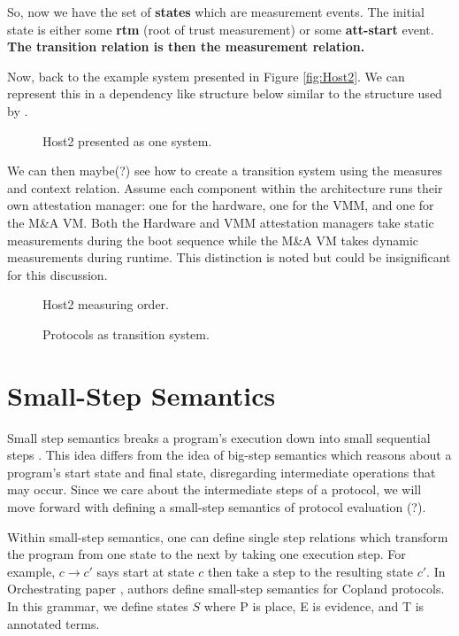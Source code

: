 \documentclass[12pt, letterpaper]{article}
\begin{document}
So, now we have the set of \textbf{states} which are measurement events. The initial state is either some \textbf{rtm} (root of trust measurement) or some \textbf{att-start} event. \textbf{The transition relation is then the measurement relation.} 

Now, back to the example system presented in Figure \ref{fig:Host2}. We can represent this in a dependency like structure below similar to the structure used by \cite{Rowe::Bundling}. 

\begin{figure}[hbtp]
  \centering
  
  \caption{Host2 presented as one system.}
  \label{host2-block}
\end{figure}

We can then maybe(?) see how to create a transition system using the measures and context relation. Assume each component within the architecture runs their own attestation manager: one for the hardware, one for the VMM, and one for the M\&A VM. Both the Hardware and VMM attestation managers take static measurements during the boot sequence while the M\&A VM takes dynamic measurements during runtime. This distinction is noted but could be insignificant for this discussion. 

\begin{figure}[hbtp]
  \centering
  
  \caption{Host2 measuring order.}
  \label{host2-measord}
\end{figure}

\begin{figure}[hbtp]
  \centering
  
  \caption{Protocols as transition system.}
  \label{transSys}
\end{figure}



\section{Small-Step Semantics}

Small step semantics breaks a program's execution down into small sequential steps \cite{FRAP}. This idea differs from the idea of big-step semantics which reasons about a program's start state and final state, disregarding intermediate operations that may occur. Since we care about the intermediate steps of a protocol, we will move forward with defining a small-step semantics of protocol evaluation (?). 

Within small-step semantics, one can define single step relations which transform the program from one state to the next by taking one execution step. For example, $c \to c'$ says start at state $c$ then take a step to the resulting state $c'$. In Orchestrating paper \cite{Ramsdell::Orchestrating}, authors define small-step semantics for Copland protocols. In this grammar, we define states $S$ where P is place, E is evidence, and T is annotated terms. 
\end{document}
